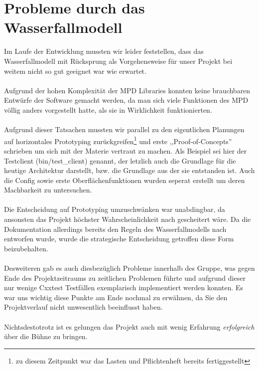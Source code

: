 \documentclass[11pt]{scrreprt}
\begin{document}
\section{Probleme durch das Wasserfallmodell}
Im Laufe der Entwicklung mussten wir leider feststellen, dass das Wasserfallmodell mit Rücksprung als Vorgehensweise für unser Projekt bei weitem nicht so gut geeignet war wie erwartet.
\\
\\
Aufgrund der hohen Komplexität der MPD Libraries konnten keine brauchbaren Entwürfe der 
Software gemacht werden, da man sich viele Funktionen des MPD völlig anders vorgestellt hatte, als sie in 
Wirklichkeit funktionierten. 
\\
\\
Aufgrund dieser Tatsachen mussten wir parallel zu den eigentlichen Planungen auf horizontales Prototyping zurückgreifen\footnote{zu diesem Zeitpunkt war das Lasten und Pflichtenheft bereits fertiggestellt} und erste ,,Proof-of-Concepts'' schrieben um sich mit der Materie vertraut zu machen.
Als Beispiel sei hier der Testclient (bin/test\_client) genannt, der letzlich auch die Grundlage für die heutige
Architektur darstellt, bzw. die Grundlage aus der sie entstanden ist. Auch die Config sowie erste Oberflächenfunktionen wurden seperat erstellt um deren Machbarkeit zu untersuchen. 
\\
\\
Die Entscheidung auf Prototyping umzuschwänken war unabdingbar, da ansonsten das Projekt 
höchster Wahrscheinlichkeit nach gescheitert wäre. Da die Dokumentation allerdings bereits den Regeln des Wasserfallmodells nach entworfen wurde,
wurde die strategische Entscheidung getroffen diese Form beizubehalten.
\\
\\
Desweiteren gab es auch diesbezüglich Probleme innerhalb des Gruppe, was gegen Ende des Projektzeitraums
zu zeitlichen Problemen führte und aufgrund dieser nur wenige Cxxtest Testfällen exemplarisch implementiert werden konnten.
Es war uns wichtig diese Punkte am Ende nochmal zu erwähnen, da Sie den Projektverlauf nicht unwesentlich beeinflusst haben.
\\
\\
Nichtsdestotrotz ist es gelungen das Projekt auch mit wenig Erfahrung \emph{erfolgreich} über die Bühne zu bringen. 
\end{document}

